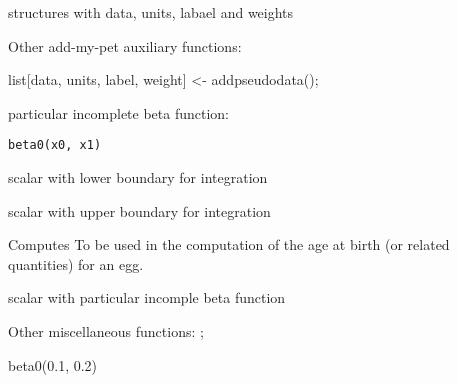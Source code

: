 \documentclass[a4paper]{book}
\begin{document}
%
\begin{Value}
structures with data, units, labael and weights
\end{Value}
%
\begin{SeeAlso}\relax
Other add-my-pet auxiliary functions: 
\end{SeeAlso}
%
\begin{Examples}
\begin{ExampleCode}
list[data, units, label, weight] <- addpseudodata();
\end{ExampleCode}
\end{Examples}
%
\begin{Description}\relax
particular incomplete beta function:
\end{Description}
%
\begin{Usage}
\begin{verbatim}
beta0(x0, x1)
\end{verbatim}
\end{Usage}
%
\begin{Arguments}
\begin{ldescription}
\item[\code{x0}] scalar with lower boundary for integration

\item[\code{x1}] scalar with upper boundary for integration
\end{ldescription}
\end{Arguments}
%
\begin{Details}\relax
Computes
To be used in the computation of the age at birth (or related quantities) for an egg.
\end{Details}
%
\begin{Value}
scalar with particular incomple beta function
\end{Value}
%
\begin{SeeAlso}\relax
Other miscellaneous functions: ;
\end{SeeAlso}
%
\begin{Examples}
\begin{ExampleCode}
beta0(0.1, 0.2)
\end{ExampleCode}
\end{Examples}
%
\end{document}
